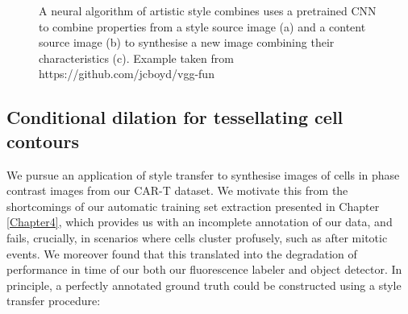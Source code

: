 \begin{figure}%
    \centering
    \qquad
    \qquad
    \caption{A neural algorithm of artistic style combines uses a pretrained CNN to combine properties from a style source image (a) and a content source image (b) to synthesise a new image combining their characteristics (c). Example taken from https://github.com/jcboyd/vgg-fun}%
    \label{fig:style_transfer}%
\end{figure}

\subsection{Conditional dilation for tessellating cell contours}

We pursue an application of style transfer to synthesise images of cells in phase contrast images from our CAR-T dataset. We motivate this from the shortcomings of our automatic training set extraction presented in Chapter \ref{Chapter4}, which provides us with an incomplete annotation of our data, and fails, crucially, in scenarios where cells cluster profusely, such as after mitotic events. We moreover found that this translated into the degradation of performance in time of our both our fluorescence labeler and object detector. In principle, a perfectly annotated ground truth could be constructed using a style transfer procedure:

